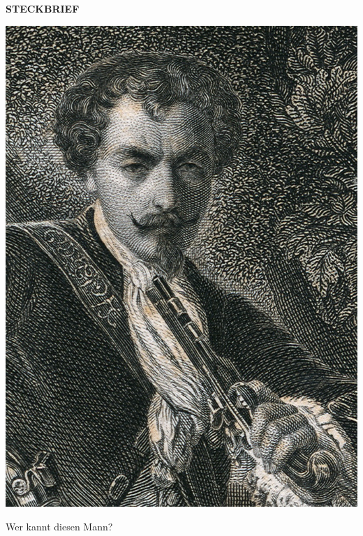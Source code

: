 \begin{center}
\begin{huge}
\textbf{\uppercase{Steckbrief}}
\end{huge}
\end{center}

\begin{center}
\includegraphics[scale=2.5]{karl}
\end{center}

Wer kannt diesen Mann?